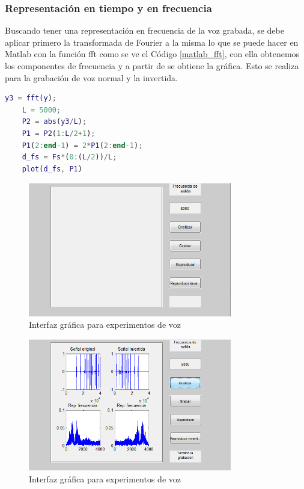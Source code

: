 \documentclass[comsoc, journal]{IEEEtran}
\begin{document}
\subsubsection{Representación en tiempo y en frecuencia}

Buscando tener una representación en frecuencia de la voz grabada, se debe aplicar primero la transformada de Fourier a la misma lo que se puede hacer en Matlab con la función fft como se ve el Código \ref{matlab_fft}, con ella obtenemos los componentes de frecuencia y a partir de se obtiene la gráfica. Esto se realiza para la grabación de voz normal y la invertida.

\begin{lstlisting}[caption={Representación en frecuencia},label={matlab_fft},language=Matlab]
	y3 = fft(y);
	L = 5000;
	P2 = abs(y3/L);
	P1 = P2(1:L/2+1);
	P1(2:end-1) = 2*P1(2:end-1);
	d_fs = Fs*(0:(L/2))/L;
	plot(d_fs, P1)
\end{lstlisting}

\begin{figure}[!t]
\centering
\includegraphics[width=3.5in]{imgs/voz_1.png}
\caption{Interfaz gráfica para experimentos de voz}
\label{voz_1}
\end{figure}

\begin{figure}[!t]
\centering
\includegraphics[width=3.5in]{imgs/voz_2.png}
\caption{Interfaz gráfica para experimentos de voz}
\label{voz_2}
\end{figure}
\end{document}
